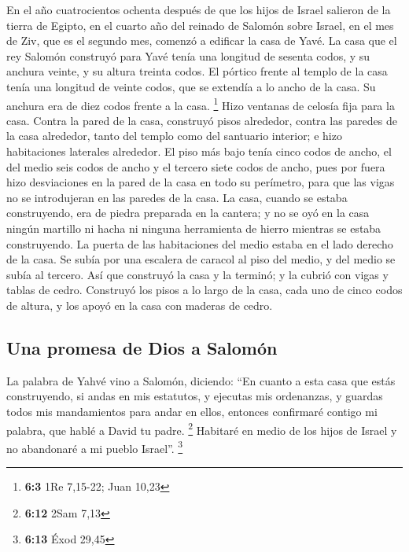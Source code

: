 \begin{paracol}{2}
 En el año cuatrocientos ochenta después de que los hijos
de Israel salieron de la tierra de Egipto, en el cuarto año del reinado
de Salomón sobre Israel, en el mes de Ziv, que es el segundo mes,
comenzó a edificar la casa de Yavé.  La casa que el rey
Salomón construyó para Yavé tenía una longitud de sesenta codos, y su
anchura veinte, y su altura treinta codos.  El pórtico
frente al templo de la casa tenía una longitud de veinte codos, que se
extendía a lo ancho de la casa. Su anchura era de diez codos frente a la
casa. \footnote{\textbf{6:3} 1Re 7,15-22; Juan 10,23} 
Hizo ventanas de celosía fija para la casa.  Contra la
pared de la casa, construyó pisos alrededor, contra las paredes de la
casa alrededor, tanto del templo como del santuario interior; e hizo
habitaciones laterales alrededor.  El piso más bajo tenía
cinco codos de ancho, el del medio seis codos de ancho y el tercero
siete codos de ancho, pues por fuera hizo desviaciones en la pared de la
casa en todo su perímetro, para que las vigas no se introdujeran en las
paredes de la casa.  La casa, cuando se estaba
construyendo, era de piedra preparada en la cantera; y no se oyó en la
casa ningún martillo ni hacha ni ninguna herramienta de hierro mientras
se estaba construyendo.  La puerta de las habitaciones del
medio estaba en el lado derecho de la casa. Se subía por una escalera de
caracol al piso del medio, y del medio se subía al tercero.
 Así que construyó la casa y la terminó; y la cubrió con
vigas y tablas de cedro.  Construyó los pisos a lo largo
de la casa, cada uno de cinco codos de altura, y los apoyó en la casa
con maderas de cedro.

\hypertarget{una-promesa-de-dios-a-salomuxf3n}{%
\subsection{Una promesa de Dios a
Salomón}\label{una-promesa-de-dios-a-salomuxf3n}}

 La palabra de Yahvé vino a Salomón, diciendo:
 ``En cuanto a esta casa que estás construyendo, si andas
en mis estatutos, y ejecutas mis ordenanzas, y guardas todos mis
mandamientos para andar en ellos, entonces confirmaré contigo mi
palabra, que hablé a David tu padre. \footnote{\textbf{6:12} 2Sam 7,13}
 Habitaré en medio de los hijos de Israel y no abandonaré
a mi pueblo Israel''. \footnote{\textbf{6:13} Éxod 29,45}


\end{paracol}
